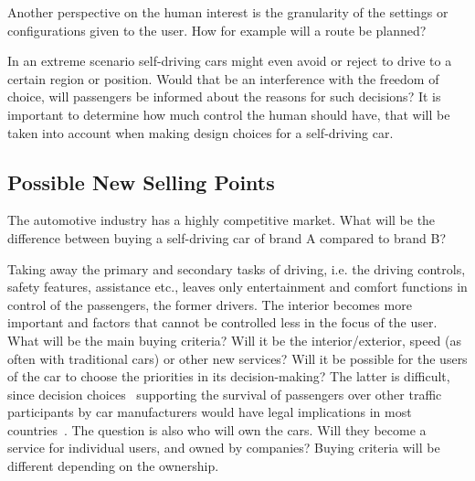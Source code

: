 Another perspective on the human interest is the granularity of the settings or configurations given to the user. How for example will a route be planned? %

In an extreme scenario self-driving cars might even avoid or reject to drive to a certain region or position. Would that be an interference with the freedom of choice, will passengers be informed about the reasons for such decisions? It is important to determine how much control the human should have, that will be taken into account when making design choices for a self-driving car. 


\subsection{Possible New Selling Points}
\label{sec:EAofNONTC:SellingPoints}

The automotive industry has a highly competitive market. What will be the difference between buying a self-driving car of brand A compared to brand B? 

Taking away the primary and secondary tasks of driving, i.e. the driving controls, safety features, assistance etc., leaves only entertainment and comfort functions in control of the passengers, the former drivers. The interior becomes more important and factors that cannot be controlled less in the focus of the user. What will be the main buying criteria? Will it be the interior/exterior, speed (as often with traditional cars) or other new services? Will it be possible for the users of the car to choose the priorities in its decision-making? The latter is difficult, since decision choices~\cite{CarAndDriverTaylor2016} supporting the survival of passengers over other traffic participants by car manufacturers would have legal implications in most countries~\cite{Daimler2016pr}. The question is also who will own the cars. Will they become a service for individual users, and owned by companies? Buying criteria will be different depending on the ownership.



